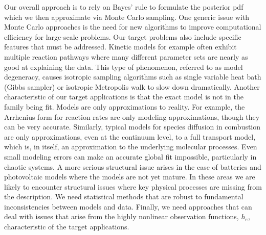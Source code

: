 \documentclass[11pt]{article}
\begin{document}
Our overall approach is to rely on Bayes' rule to formulate the posterior pdf which we then approximate via Monte Carlo sampling. One generic issue with Monte Carlo approaches
is the need for new algorithms to improve computational efficiency for large-scale problems.
Our target problems also include specific features that must be addressed.
Kinetic models for example often exhibit multiple reaction pathways where
many different parameter sets are nearly as good at explaining the data.
This type of phenomenon, referred to as model degeneracy,
causes isotropic sampling algorithms such as single variable heat bath (Gibbs sampler) or isotropic
Metropolis walk to slow down dramatically.
Another characteristic of our target applications is that
the exact model is not in the family being fit.
Models are only approximations to reality.
For example, the Arrhenius form for reaction rates are only modeling approximations, though they can be very accurate. Similarly, typical models for species diffusion in combustion are only approximations, even at the continuum level,
to a full transport model, which is, in itself, an approximation to the underlying molecular processes.
Even small modeling errors can make an accurate global fit impossible, particularly in chaotic systems.
A more serious structural issue arises in the case of batteries and photovoltaic models where the models
are not yet mature.  In these areas we are likely to encounter structural issues where key physical
processes are missing from the description.
We need statistical methods that are robust to fundamental inconsistencies between models and data.
Finally, we need approaches that can deal with issues that arise from the highly nonlinear observation
functions, $h_e$, characteristic of the target applications.
\end{document}
